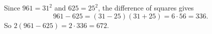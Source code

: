 Since $961=31^2$ and $625=25^2$, the difference of squares gives
\[961-625=(31-25)(31+25)=6\cdot56=336.\]
So $2(961-625)=2\cdot336=\boxed{672}$.
